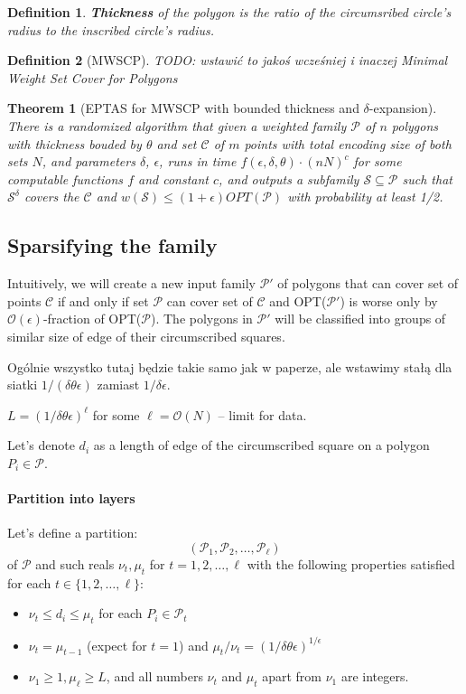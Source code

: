 \documentclass[en]{pracamgr}
\newtheorem{defi}{Definition}[section]
\newtheorem{tw}{Theorem}[section]
\begin{document}
\begin{defi}
  \textbf{Thickness} of the polygon
  is the ratio of the circumsribed circle's
  radius to the inscribed circle's radius.
\end{defi}

\begin{defi}[MWSCP]
	TODO: wstawić to jakoś wcześniej i inaczej
	Minimal Weight Set Cover for Polygons
\end{defi}

\begin{tw}[EPTAS for MWSCP with bounded thickness and $\delta$-expansion]
There is a randomized algorithm that given
a weighted family $\mathcal{P}$ of $n$ polygons
with thickness bouded by $\theta$
and set $\mathcal{C}$ of $m$ points
with total encoding
size of both sets $N$, and parameters $\delta$, $\epsilon$,
runs in time $f(\epsilon, \delta, \theta) \cdot (nN)^c$
for some computable functions $f$ and constant $c$,
and outputs a subfamily $\mathcal{S} \subseteq \mathcal{P}$
such that $\mathcal{S}^{\delta}$
covers the $\mathcal{C}$
and $w(\mathcal{S}) \le (1+\epsilon)OPT(\mathcal{P})$
with probability at least 1/2.
\end{tw}

\subsection{Sparsifying the family}
Intuitively, we will create a new input family
$\mathcal{P'}$ of polygons that 
can cover set of points $\mathcal{C}$
if and only if set $\mathcal{P}$
can cover set of $\mathcal{C}$
and OPT($\mathcal{P'}$)
is worse only by $\mathcal{O}(\epsilon)$-fraction of OPT($\mathcal{P}$).
The polygons in $\mathcal{P'}$ will be classified
into groups of similar size of edge of their
circumscribed squares.

Ogólnie wszystko tutaj będzie takie samo jak
w paperze, ale wstawimy stałą dla siatki 
$1/(\delta\theta\epsilon)$
zamiast $1/\delta\epsilon$.

$L = (1/\delta\theta\epsilon)^{\ell}$
for some $\ell = \mathcal{O}(N)$ -- limit for data.

Let's denote $d_i$ as a length of edge of the
circumscribed square on a polygon $P_i \in \mathcal{P}$.

\paragraph{Partition into layers}
Let's define a partition:
$$(\mathcal{P}_1, \mathcal{P}_2, \ldots, \mathcal{P_{\ell}})$$
of $\mathcal{P}$ and such reals $\nu_t, \mu_t$
for $t = 1, 2, \ldots, \ell$ with
the following properties satisfied for each $t \in \{1,2,\ldots, \ell\}$:
\begin{itemize}
\item $\nu_t \le d_i \le \mu_t$ for each $P_i \in \mathcal{P}_t$
\item $\nu_t = \mu_{t-1}$ (expect for $t=1$) and $\mu_t/\nu_t = (1/\delta\theta\epsilon)^{1/\epsilon}$
\item $\nu_1 \ge 1, \mu_\ell \ge L$, and all numbers $\nu_t$ and $\mu_t$ apart from $\nu_1$ are integers.
\end{itemize}
\end{document}
